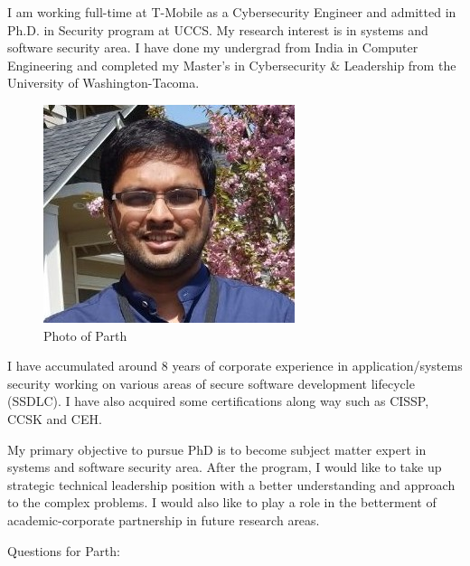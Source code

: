I am working full-time at T-Mobile as a Cybersecurity Engineer and admitted in Ph.D. in Security program at UCCS. 
My research interest is in systems and software security area. 
I have done my undergrad from India in Computer Engineering and completed my Master’s in Cybersecurity \& Leadership from the University of Washington-Tacoma. 
\begin{figure}[h!]
\centering
\includegraphics[scale=0.5]{parth_shah.jpg}
\caption{Photo of Parth}
\label{fig:profile}
\end{figure}
I have accumulated around 8 years of corporate experience in application/systems security working on various areas of secure software development lifecycle (SSDLC). 
I have also acquired some certifications along way such as CISSP, CCSK and CEH.  


My primary objective to pursue PhD is to become subject matter expert in systems and software security area. 
After the program, I would like to take up strategic technical leadership position with a better understanding and approach to the complex problems. 
I would also like to play a role in the betterment of academic-corporate partnership in future research areas.

Questions for Parth:

